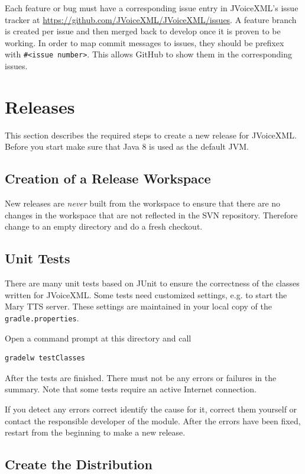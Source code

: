 \documentclass[11pt,a4paper]{article}
\begin{document}
Each feature or bug must have a corresponding issue entry in JVoiceXML's issue tracker
at \url{https://github.com/JVoiceXML/JVoiceXML/issues}. A feature branch is created
per issue and then merged back to develop once it is proven to be working. In order to
map commit messages to issues, they should be prefixex with \texttt{\#{\textless}issue number{\textgreater}}.
This allows GitHub to show them in the corresponding issues.

\section{Releases}

This section describes the required steps to create a new release for
JVoice\-XML.
Before you start make sure that Java 8 is used as the default JVM.

\subsection{Creation of a Release Workspace}

New releases are \emph{never} built from the workspace to ensure that there are
no changes in the workspace that are not reflected in the SVN repository.
Therefore change to an empty directory and do a fresh checkout.


\subsection{Unit Tests}

There are many unit tests based on JUnit to ensure the correctness of the
classes written for JVoiceXML. Some tests need customized settings, e.g. to
start the Mary TTS server. These settings are maintained in your local copy of the
\texttt{gradle.properties}.

Open a command prompt at this directory and call
\begin{lstlisting}
gradelw testClasses
\end{lstlisting}

After the tests are finished. There must not be any errors or failures in the summary. Note that
some tests require an active Internet connection. 

If you detect any errors correct identify the cause for it, correct them
yourself or contact the responsible developer of the module. After the errors
have been fixed, restart from the beginning to make a new release.

\subsection{Create the Distribution}
\end{document}
